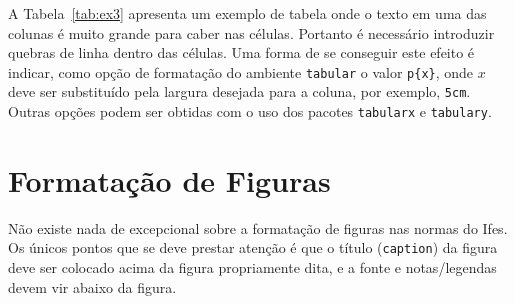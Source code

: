 \documentclass[times,english,brazil,oneside]{ifes7}
\begin{document}
\begin{table}[h]
\end{table}

A Tabela~\ref{tab:ex3} apresenta um exemplo de tabela onde o texto em
uma das colunas é muito grande para caber nas células. Portanto é
necessário introduzir quebras de linha dentro das células. Uma forma
de se conseguir este efeito é indicar, como opção de formatação do
ambiente \texttt{tabular} o valor \verb!p{x}!, onde $x$ deve ser
substituído pela largura desejada para a coluna, por exemplo,
\texttt{5cm}. Outras opções podem ser obtidas com o uso dos pacotes
\texttt{tabularx} e \texttt{tabulary}.



\section{Formatação de Figuras}
\label{sec:format-figuras}

Não existe nada de excepcional sobre a formatação de figuras nas
normas do Ifes. Os únicos pontos que se deve prestar atenção é que o
título (\texttt{caption}) da figura deve ser colocado acima da figura
propriamente dita, e a fonte e notas/legendas devem vir abaixo da
figura.
\end{document}
